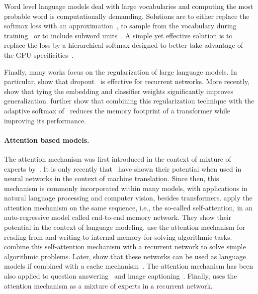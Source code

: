 \documentclass{article}
\begin{document}
Word level language models deal with large vocabularies and computing the most probable word is computationally demanding.
Solutions are to either replace the softmax loss with an approximation~\cite{goodman2001bit, morin2005hierarchical},
to sample from the vocabulary during training~\cite{bengio2003quick,jozefowicz2016exploring} or to include  subword units~\cite{sennrich2015neural}.
A simple yet effective solution is to replace the loss by a hierarchical softmax designed to better take advantage of the GPU specificities~\cite{grave2017efficient}.

Finally, many works focus on the regularization of large language models.
In particular, \citet{zaremba2014recurrent} show that dropout~\cite{srivastava2014dropout} is effective for recurrent networks.
More recently, \citet{press2016using} show that tying the embedding and classifier weights significantly improves generalization.
\citet{baevski2018adaptive} further show that combining this regularization technique
with the adaptive softmax of~\cite{grave2017efficient} reduces the memory footprint of a transformer while improving its performance.

\paragraph{Attention based models.}
The attention mechanism was first introduced in the context of mixture of experts by~\citet{jordan1994hierarchical}.
It is only recently that~\citet{bahdanau2014neural} have shown their potential when used in neural networks in the context of machine translation.
Since then, this mechanism is commonly incorporated within many models, with applications in natural language processing and computer vision, besides transformers.
\citet{sukhbaatar2015end} apply the attention mechanism on the same sequence, i.e., the so-called self-attention, in an auto-regressive model called end-to-end memory network.
They show their potential in the context of language modeling.
\citet{graves2014neural} use the attention mechanism for reading from and writing to internal memory for solving algorithmic tasks.
\citet{vinyals2015pointer} combine this self-attention mechanism with a recurrent network to solve simple algorithmic problems.
Later, \citet{merity2016pointer} show that these networks can be used as language models if combined with a cache mechanism~\cite{grave2016improving}.
The attention mechanism has been also applied to question answering~\citep{miller2016key} and image captioning~\citep{xu2015show}.
Finally, \citet{shazeer2017outrageously} uses the attention mechanism as a mixture of experts in a recurrent network.
 
\end{document}
